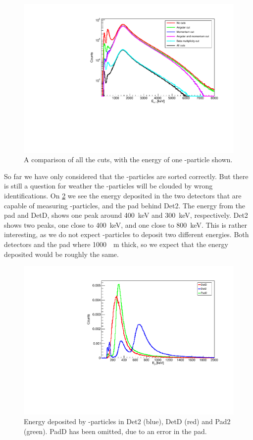 \begin{figure}[h]
	\centering
	\includegraphics[width=\linewidth]{../figures/cutCompare.pdf}
	\caption{A comparison of all the cuts, with the energy of one \al-particle shown. }
	\label{fig:allCutsCompare}
\end{figure}

So far we have only considered that the \al-particles are sorted correctly. But there is still a question for weather the \be-particles will be clouded by wrong identifications. 
On \cref{fig:beSpectrum} we see the energy deposited in the two detectors that are capable of measuring \be-particles, and the pad behind Det2.
The energy from the pad and DetD, shows one peak around \SI{400}{keV} and \SI{300}{keV}, respectively. 
Det2 shows two peaks, one close to \SI{400}{keV}, and one close to \SI{800}{keV}. This is rather interesting, as we do not expect \be-particles to deposit two different energies. Both detectors and the pad where \SI{1000}{\mu m} thick, so we expect that the energy deposited would be roughly the same. 

\begin{figure}[h]
	\centering
	\includegraphics[width=\linewidth]{../figures/betaSpec.pdf}
	\caption{Energy deposited by \be-particles in Det2 (blue), DetD (red) and Pad2 (green). PadD has been omitted, due to an error in the pad.}
	\label{fig:beSpectrum}
\end{figure}

